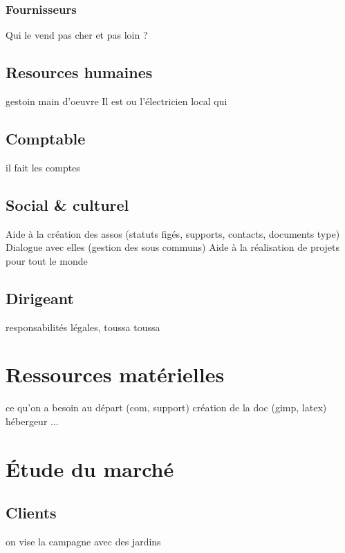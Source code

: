 \documentclass[10pt]{article}
\begin{document}
\subsubsection{Fournisseurs}
\label{ssub:}

Qui le vend pas cher et pas loin ?


\subsection{Resources humaines}
\label{sec:rh}
gestoin main d'oeuvre
Il est ou l'électricien local qui

\subsection{Comptable}
\label{sec:}
il fait les comptes

\subsection{Social \& culturel}
\label{sec:}
Aide à la création des assos (statuts figés, supports, contacts, documents type)
Dialogue avec elles (gestion des sous communs)
Aide à la réalisation de projets pour tout le monde

\subsection{Dirigeant}
\label{sec:dirigeant}
responsabilités légales, toussa toussa


\section{Ressources matérielles}
\label{sec:ressources}
ce qu'on a besoin au départ (com, support)
création de la doc (gimp, latex)
hébergeur ...

\section{Étude du marché}
\label{sec:marche}

\subsection{Clients}
\label{sub:client}
on vise la campagne avec des jardins
\end{document}
